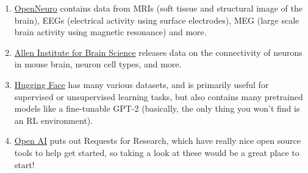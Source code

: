 \documentclass[letterpaper,11pt]{article}
\begin{document}
\begin{enumerate}
    \item \href{https://openneuro.org/search}{OpenNeuro} contains data from MRIs (soft tissue and structural image of the brain), EEGs (electrical activity using surface electrodes),  MEG (large scale brain activity using magnetic resonance) and more.
    \item \href{https://portal.brain-map.org/}{Allen Institute for Brain Science} releases data on the connectivity of neurons in mouse brain, neuron cell types, and more.
    \item \href{https://huggingface.co/datasets}{Hugging Face} has many various datasets, and is primarily useful for supervised or unsupervised learning tasks, but also contains many pretrained models like a fine-tunable GPT-2 (basically, the only thing you won't find is an RL environment).
    \item \href{https://openai.com/research/requests-for-research-2}{Open AI} puts out Requests for Research, which have really nice open source tools to help get started, so taking a look at these would be a great place to start!

\end{enumerate}
\end{document}
